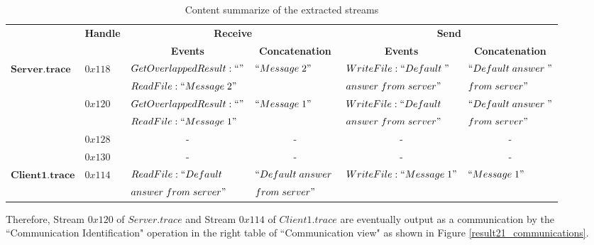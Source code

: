 \documentclass[12pt,oneside]{book}
\begin{document}
\begin{table}[H]
  \tiny
  \centering
  \caption{Content summarize of the extracted streams}
  \label{contentresult21}
  \begin{tabular}{|l|l|l|l|l|l|}
\hline            
& \multirow{2}{*}{\textbf{Handle}} & \multicolumn{2}{c|}{\textbf{Receive} }&\multicolumn{2}{c|}{\textbf{Send}} \\
\cline{3-6}
& &\multicolumn{1}{c|}{ \textbf{Events} }&\multicolumn{1}{c|}{\textbf{ Concatenation}}&\multicolumn{1}{c|}{ \textbf{Events} }&\multicolumn{1}{c|}{\textbf{ Concatenation}}\\
\hline 
\multirow{6}{*}{$\boldsymbol{Server.trace}$} &\multirow{2}{*}{$0x118$} & $GetOverlappedResult:``"$ & \multirow{2}{*}{$``Message\; 2"$} & $WriteFile:``Default\; "$ &  $``Default\; answer\; "$\\
\cline{3-3}
& &$ReadFile:``Message\; 2"$ &  & $answer\; from\; server"$&$from\; server"$\\
\cline{2-6}    
      &\multirow{2}{*}{$0x120$} & $GetOverlappedResult:``"$ & \multirow{2}{*}{$``Message\; 1"$} & $WriteFile:``Default\; $ &  $``Default\; answer\; "$\\
\cline{3-3}
& &$ReadFile:``Message\; 1"$ & &$answer\; from\; server"$ &$from\; server"$\\  
\cline{2-6}   
& $0x128$&\multicolumn{1}{c|}{- }&\multicolumn{1}{c|}{- } &\multicolumn{1}{c|}{- } &\multicolumn{1}{c|}{- }\\  
\cline{2-6}   
& $0x130$&\multicolumn{1}{c|}{- } &\multicolumn{1}{c|}{- } &\multicolumn{1}{c|}{- } &\multicolumn{1}{c|}{- }\\      
\hline  
\multirow{2}{*}{$\boldsymbol{Client1.trace}$ }&\multirow{2}{*}{$0x114$ }& $ReadFile: ``Default\; $ & $``Default\; answer\; $ & \multirow{2}{*}{$WriteFile:``Message\; 1"$ } &  \multirow{2}{*}{$``Message\; 1"$}\\
& &$answer\; from\; server"$& $ from\; server"$ & &\\
\hline
  \end{tabular}
\end{table}

Therefore, Stream $0x120$ of $Server.trace$ and Stream $0x114$ of $Client1.trace$ are eventually output as a communication by the ``Communication Identification" operation in the right table of ``Communication view" as shown in Figure \ref{result21_communications}. 
\end{document}
